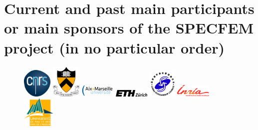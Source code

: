\documentclass[oneside,english,onecolumn,letterpaper]{book}
\begin{document}
\section*{Current and past main participants or main sponsors of the SPECFEM project (in no particular order)}
%
\begin{figure}[htbp]
\noindent \begin{centering}
\includegraphics[width=0.125\textwidth]{figures/logo_cnrs}\vspace*{2truemm}
\includegraphics[width=0.125\textwidth]{figures/logo_princeton}\vspace*{2truemm}
\includegraphics[width=0.15\textwidth]{figures/logo_aix_marseille_universite}\vspace*{0.02truemm}
\includegraphics[width=0.15\textwidth]{figures/logo_ETH}\vspace*{2truemm}
\includegraphics[width=0.12\textwidth]{figures/logo_CSC_China}\vspace*{0.02truemm}
\includegraphics[width=0.15\textwidth]{figures/logo_inria}\vspace*{2truemm}
\includegraphics[width=0.14\textwidth]{figures/logo_UPPA}
\par\end{centering}
%

\end{figure}
\end{document}
